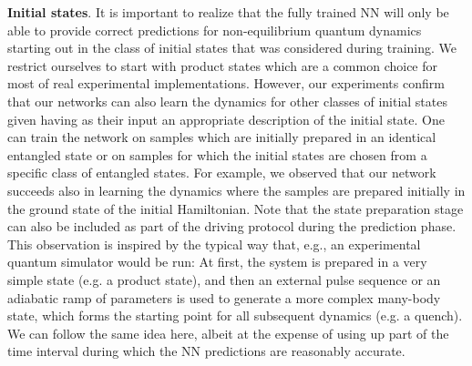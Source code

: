 \documentclass[a4paper,aps,amsmath,amssymb,twocolumn,longbibliography,,accepted=2022-05-17]{quantumarticle}
\begin{document}
\textbf{Initial states}. It is important to realize that the fully trained NN will only be able to provide correct predictions for non-equilibrium quantum dynamics starting out in the class of initial states that was considered during training. %
We restrict ourselves to start with product states which are a common choice for most of real experimental implementations. However, our experiments confirm that our networks can also learn the dynamics for other classes of initial states given having as their input an appropriate description of the initial state.
 One can train the network on samples which are initially prepared in an identical entangled state or on samples for which the initial states are chosen from a specific class of  entangled states. For example, we observed that our network succeeds also in learning the dynamics  where the samples are  prepared initially in the ground state of the initial Hamiltonian. Note that the state preparation stage can also be included as part of the driving protocol during the prediction phase. This observation is inspired by the typical way that, e.g., an experimental quantum simulator would be run: At first, the system is prepared in a very simple state (e.g. a product state), and then an external pulse sequence or an adiabatic ramp of parameters is used to generate a more complex many-body state, which forms the starting point for all subsequent dynamics (e.g. a quench). We can follow the same idea here, albeit at the expense of using up part of the time interval during which the NN predictions are reasonably accurate. 
\end{document}
